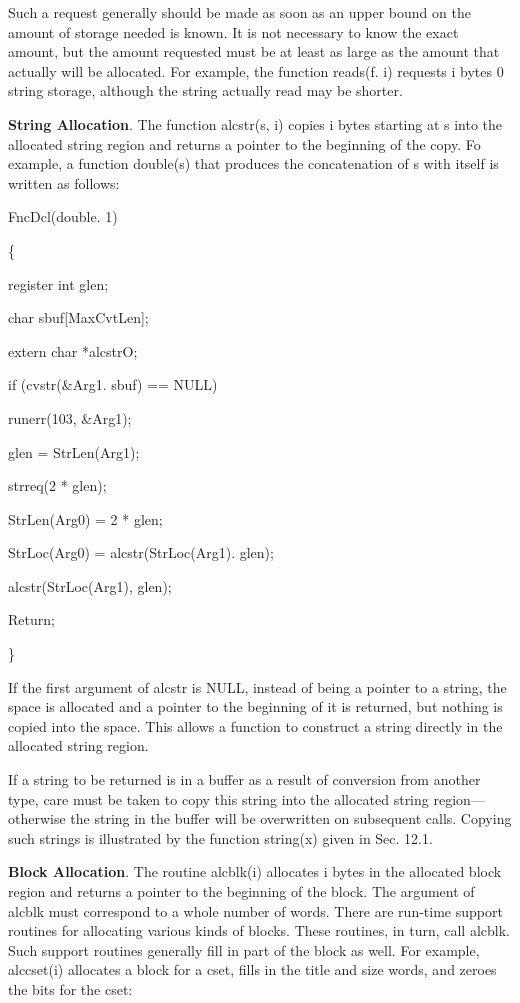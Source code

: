 Such a request generally should be made as soon as an upper bound on
the amount of storage needed is known. It is not necessary to know the
exact amount, but the amount requested must be at least as large as
the amount that actually will be allocated. For example, the function
reads(f. i) requests i bytes 0 string storage, although the string
actually read may be shorter.

\textbf{String Allocation}. The function alcstr(s, i) copies i bytes
starting at s into the allocated string region and returns a pointer
to the beginning of the copy. Fo example, a function double(s) that
produces the concatenation of s with itself is written as follows:

{\ttfamily\mdseries
FncDcl(double. 1)}

{\ttfamily\mdseries
\{}

{\ttfamily\mdseries
register int glen;}

{\ttfamily\mdseries
char sbuf[MaxCvtLen];}

{\ttfamily\mdseries
extern char *alcstrO;}

{\ttfamily\mdseries
if (cvstr(\&Arg1. sbuf) == NULL)}

{\ttfamily\mdseries
runerr(103, \&Arg1);}

{\ttfamily\mdseries
glen = StrLen(Arg1);}

{\ttfamily\mdseries
strreq(2 * glen);}

{\ttfamily\mdseries
StrLen(Arg0) = 2 * glen;}

{\ttfamily\mdseries
StrLoc(Arg0) = alcstr(StrLoc(Arg1). glen);}

{\ttfamily\mdseries
alcstr(StrLoc(Arg1), glen);}

{\ttfamily\mdseries
Return;}

{\ttfamily\mdseries
\}}


If the first argument of alcstr is NULL, instead of being a pointer to
a string, the space is allocated and a pointer to the beginning of it
is returned, but nothing is copied into the space. This allows a
function to construct a string directly in the allocated string
region.

If a string to be returned is in a buffer as a result of conversion
from another type, care must be taken to copy this string into the
allocated string region---otherwise the string in the buffer will
be overwritten on subsequent calls. Copying such strings is
illustrated by the function string(x) given in Sec. 12.1.

\textbf{Block Allocation}. The routine alcblk(i) allocates i bytes in
the allocated block region and returns a pointer to the beginning of
the block. The argument of alcblk must correspond to a whole number of
words. There are run-time support routines for allocating various
kinds of blocks. These routines, in turn, call alcblk. Such support
routines generally fill in part of the block as well. For example,
alccset(i) allocates a block for a cset, fills in the title and size
words, and zeroes the bits for the cset:

